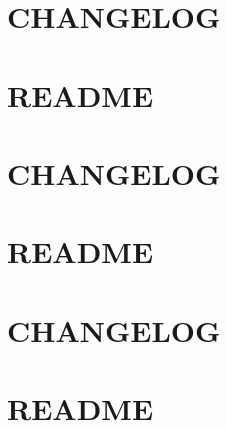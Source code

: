 \documentclass[twoside]{book}
\newcommand{\+}{\discretionary{\mbox{\scriptsize$\hookleftarrow$}}{}{}}
\begin{document}
\chapter{C\+H\+A\+N\+G\+E\+L\+OG}
\label{md__c_1_workspace_demo_src_main_script_node_modules_postcss-load-config__c_h_a_n_g_e_l_o_g}

\chapter{R\+E\+A\+D\+ME}
\label{md__c_1_workspace_demo_src_main_script_node_modules_postcss-load-config__r_e_a_d_m_e}

\chapter{C\+H\+A\+N\+G\+E\+L\+OG}
\label{md__c_1_workspace_demo_src_main_script_node_modules_postcss-load-options__c_h_a_n_g_e_l_o_g}

\chapter{R\+E\+A\+D\+ME}
\label{md__c_1_workspace_demo_src_main_script_node_modules_postcss-load-options__r_e_a_d_m_e}

\chapter{C\+H\+A\+N\+G\+E\+L\+OG}
\label{md__c_1_workspace_demo_src_main_script_node_modules_postcss-load-plugins__c_h_a_n_g_e_l_o_g}

\chapter{R\+E\+A\+D\+ME}
\label{md__c_1_workspace_demo_src_main_script_node_modules_postcss-load-plugins__r_e_a_d_m_e}

\end{document}
